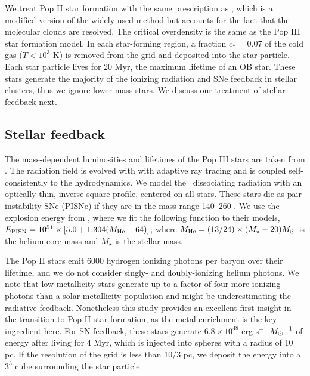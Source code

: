 \documentclass[apjl]{emulateapj}
\begin{document}
%

We treat Pop II star formation with the same prescription as
\citet{Wise09}, which is a modified version of the widely used
\citet{Cen92} method but accounts for the fact that the molecular
clouds are resolved.  The critical overdensity is the same as the Pop
III star formation model.  In each star-forming region, a fraction
$c_* = 0.07$ of the cold gas ($T < 10^3$ K) is removed from the grid
and deposited into the star particle.  Each star particle lives for 20
Myr, the maximum lifetime of an OB star.  These stars generate the
majority of the ionizing radiation and SNe feedback in stellar
clusters, thus we ignore lower mass stars.  We discuss our treatment
of stellar feedback next.

\subsection{Stellar feedback}

The mass-dependent luminosities and lifetimes of the Pop III stars are
taken from \citet{Schaerer02}.  The radiation field is evolved with
with adaptive ray tracing \citep{Abel02_RT, Wise10} and is coupled
self-consistently to the hydrodynamics.  We model the \hh~dissociating
radiation with an optically-thin, inverse square profile, centered on
all stars.  These stars die as pair-instability SNe (PISNe) if they
are in the mass range 140--260 \Ms \citep{Heger03}.  We use the
explosion energy from \citet{Heger02}, where we fit the following
function to their models, $E_{\rm PISN} = 10^{51} \times [5.0 + 1.304
(M_{\rm He} - 64)]$, where $M_{\rm He} = (13/24) \times (M_\star - 20)
\Ms$ is the helium core mass and $M_\star$ is the stellar mass.

The Pop II stars emit 6000 hydrogen ionizing photons per baryon over
their lifetime, and we do not consider singly- and doubly-ionizing
helium photons.  We note that low-metallicity stars generate up to a
factor of four more ionizing photons than a solar metallicity
population \citep{Schaerer03} and might be underestimating the
radiative feedback.  Nonetheless this study provides an excellent
first insight in the transition to Pop II star formation, as the metal
enrichment is the key ingredient here.  For SN feedback, these stars
generate $6.8 \times 10^{48}$ erg s$^{-1}$ $\Ms^{-1}$ of energy after
living for 4 Myr, which is injected into spheres with a radius of 10
pc.  If the resolution of the grid is less than 10/3 pc, we deposit
the energy into a $3^3$ cube surrounding the star particle.
\end{document}
